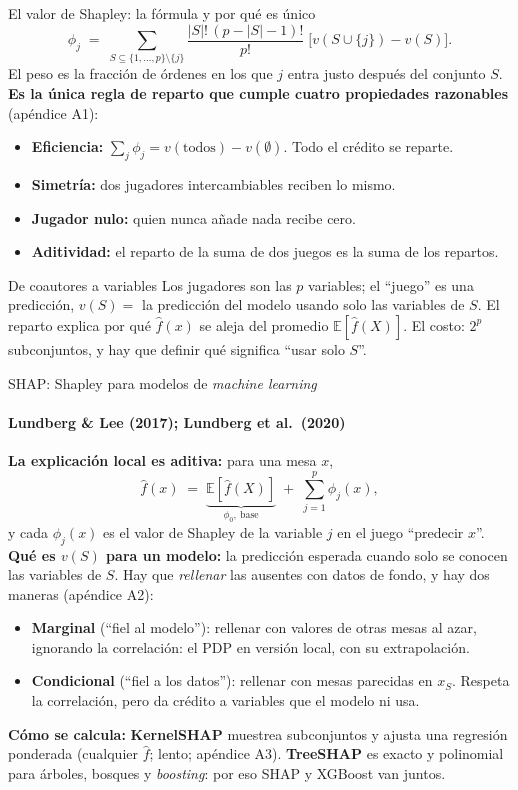 \documentclass{beamer}
\newcommand{\E}{\mathbb{E}}
\newcommand{\1}{\mathbb{I}}
\begin{document}
\begin{frame}{El valor de Shapley: la fórmula y por qué es único}
\small
\[ \phi_j \;=\; \sum_{S \subseteq \{1,\ldots,p\} \setminus \{j\}} \frac{|S|!\,(p - |S| - 1)!}{p!}\;\Big[ v(S \cup \{j\}) - v(S) \Big]. \]
El peso es la fracción de órdenes en los que $j$ entra justo después del conjunto $S$.
\pause
\vspace{0.1cm}
\textbf{Es la única regla de reparto que cumple cuatro propiedades razonables} (apéndice A1):
\begin{itemize}\itemsep2pt
  \item \textbf{Eficiencia:} $\sum_j \phi_j = v(\text{todos}) - v(\emptyset)$. Todo el crédito se reparte.
  \item \textbf{Simetría:} dos jugadores intercambiables reciben lo mismo.
  \item \textbf{Jugador nulo:} quien nunca añade nada recibe cero.
  \item \textbf{Aditividad:} el reparto de la suma de dos juegos es la suma de los repartos.
\end{itemize}
\pause
\vspace{0.1cm}
\begin{block}{De coautores a variables}
Los jugadores son las $p$ variables; el ``juego'' es una predicción, $v(S) = $ la predicción del modelo usando solo las variables de $S$. El reparto explica por qué $\hat{f}(x)$ se aleja del promedio $\E[\hat{f}(X)]$. El costo: $2^p$ subconjuntos, y hay que definir qué significa ``usar solo $S$''.
\end{block}
\end{frame}

\begin{frame}{SHAP: Shapley para modelos de \emph{machine learning}}
\framesubtitle{Lundberg \& Lee (2017); Lundberg et al.\ (2020)}
\small
\textbf{La explicación local es aditiva:} para una mesa $x$,
\[ \hat{f}(x) \;=\; \underbrace{\E[\hat{f}(X)]}_{\phi_0,\ \text{base}} \;+\; \sum_{j=1}^{p} \phi_j(x), \]
y cada $\phi_j(x)$ es el valor de Shapley de la variable $j$ en el juego ``predecir $x$''.
\pause
\vspace{0.05cm}
\textbf{Qué es $v(S)$ para un modelo:} la predicción esperada cuando solo se conocen las variables de $S$. Hay que \emph{rellenar} las ausentes con datos de fondo, y hay dos maneras (apéndice A2):
\begin{itemize}\itemsep1pt
  \item \textbf{Marginal} (``fiel al modelo''): rellenar con valores de otras mesas al azar, ignorando la correlación: el PDP en versión local, con su extrapolación.
  \item \textbf{Condicional} (``fiel a los datos''): rellenar con mesas parecidas en $x_S$. Respeta la correlación, pero da crédito a variables que el modelo ni usa.
\end{itemize}
\pause
\textbf{Cómo se calcula:} \textbf{KernelSHAP} muestrea subconjuntos y ajusta una regresión ponderada (cualquier $\hat{f}$; lento; apéndice A3). \textbf{TreeSHAP} es exacto y polinomial para árboles, bosques y \emph{boosting}: por eso SHAP y XGBoost van juntos.
\end{frame}
\end{document}
